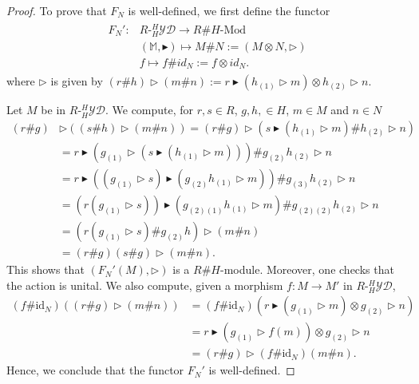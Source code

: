 \documentclass{amsart}
\theoremstyle{definition}
\newcommand{\YD}[1]{\ensuremath{{}^{#1}_{#1}\mathcal{YD}}}
\begin{document}
	\begin{proof}
		To prove that $F_N$ is well-defined, we first define the functor
		\begin{align}
		\begin{aligned}
		F_N'\colon &R\text{-}\YD{H} \rightarrow R\#H\text{-}\text{Mod} \\
		& (\mathbb M,\blacktriangleright) \mapsto 
		M\#N:=(M\otimes N,\triangleright)\\
		&f \mapsto f\# id_N:= f\otimes id_N.
		\end{aligned}
		\end{align}
		where $\triangleright$ is given by $\left(r\#h\right) \triangleright \left(m\#n\right) :=  
		r\blacktriangleright(h_{(1)}\triangleright m) \otimes h_{(2)}\triangleright n$.
		
		Let $M$ be in $R\text{-}\YD H$. We compute, for $r,s \in R$, $g,h,\in H$, $m\in M$ and $n\in N$
		\begin{align*}
		(r\#g)&\triangleright((s\#h) \triangleright(m\# n))
		=(r\# g) \triangleright (s\blacktriangleright (h_ {(1)}\triangleright m) \# h_{(2)} \triangleright n) \\
		& = r\blacktriangleright( g_{(1)}\triangleright(s\blacktriangleright (h_{(1)}\triangleright m))) \#  g_{(2)}h_{(2)}\triangleright n \\
		& =  r\blacktriangleright((g_{(1)}\triangleright s)\blacktriangleright (g_{(2)} h_{(1)}\triangleright m)) \#  g_{(3)}h_{(2)}\triangleright n \\
		& =  (r(g_{(1)}\triangleright s))\blacktriangleright (g_{(2)(1)} h_{(1)}\triangleright m) \#  g_{(2)(2)}h_{(2)}\triangleright n \\
		& = (r(g_{(1)}\triangleright s)\# g_{(2)}h)\triangleright (m\#n) \\
		& = (r\# g)(s \# g) \triangleright (m \# n).
		\end{align*}
		This shows that $(F_N'(M),\triangleright)$ is a $R\#H\text{-}$module. Moreover, one checks that the action is unital. 	We also compute, given a morphism $f: M \rightarrow  M'$ in $R\text{-}\YD H$,
		\begin{align*}
		(f\#\text{id}_N)((r\#g) \triangleright (m \# n)) &= (f\#\text{id}_N)(r\blacktriangleright(g_{(1)}\triangleright m) \otimes g_{(2)}\triangleright n) \\
		& = r\blacktriangleright(g_{(1)}\triangleright f(m)) \otimes g_{(2)}\triangleright n \\
		&  = \left(r\#g\right) \triangleright (f\#\text{id}_N)(m\#n).
		\end{align*}
		Hence, we conclude that the functor $F_N'$ is well-defined.
		

\end{proof}
\end{document}
